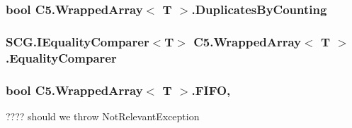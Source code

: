 \hypertarget{class_c5_1_1_wrapped_array_aac81b310cf57364283da912775316da8}{}
\subsubsection[{Duplicates\+By\+Counting}]{\setlength{\rightskip}{0pt plus 5cm}bool {\bf C5.\+Wrapped\+Array}$<$ T $>$.Duplicates\+By\+Counting\hspace{0.3cm}{\ttfamily [get]}}\label{class_c5_1_1_wrapped_array_aac81b310cf57364283da912775316da8}




\hypertarget{class_c5_1_1_wrapped_array_ad137487997743e41f5f6e56e4f0cdf53}{}
\subsubsection[{Equality\+Comparer}]{\setlength{\rightskip}{0pt plus 5cm}S\+C\+G.\+I\+Equality\+Comparer$<$T$>$ {\bf C5.\+Wrapped\+Array}$<$ T $>$.Equality\+Comparer\hspace{0.3cm}{\ttfamily [get]}}\label{class_c5_1_1_wrapped_array_ad137487997743e41f5f6e56e4f0cdf53}




\hypertarget{class_c5_1_1_wrapped_array_a5b8e3d7b8f13a7cf59f6ae04c22b60b5}{}
\subsubsection[{F\+I\+F\+O}]{\setlength{\rightskip}{0pt plus 5cm}bool {\bf C5.\+Wrapped\+Array}$<$ T $>$.F\+I\+F\+O\hspace{0.3cm}{\ttfamily [get]}, {\ttfamily [set]}}\label{class_c5_1_1_wrapped_array_a5b8e3d7b8f13a7cf59f6ae04c22b60b5}


???? should we throw Not\+Relevant\+Exception 

\hypertarget{class_c5_1_1_wrapped_array_a30b1c7c01b288c05e8d7594a1d85f1d5}{}
